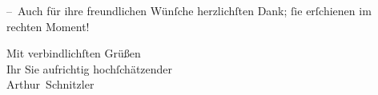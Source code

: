 \pstart
           – Auch für ihre freundlichen Wünſche herzlichſten Dank;{ }ſie erſchienen im rechten
               Moment!\pend
           
\pstart
           Mit verbindlichſten Grüßen{\\}Ihr Sie aufrichtig hochſchätzender{\\}\spacefill\mbox{Arthur Schnitzler}\pend
           \endnumbering{}
\begin{anhang}
\end{anhang}\newcommand{\dateiname}{L04328}\newcommand{\titel}{Arthur Schnitzler an Marie Herzfeld, 19. 8. 1896}\newcommand{\editorInnen}{Martin Anton Müller und Laura Untner}
